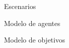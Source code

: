 \documentclass[11pt, a4paper,spanish]{article}
\begin{document}
    


    \thispagestyle{empty}
    \tableofcontents
    \pagebreak



\begin{section}{Escenarios}
        
\end{section}
\pagebreak


\begin{section}{Modelo de agentes}
        
\end{section}
\pagebreak
\begin{section}{Modelo de objetivos}
        
\end{section}\begin{flushleft}\end{flushleft}

    \pagebreak
%       
\end{document}
